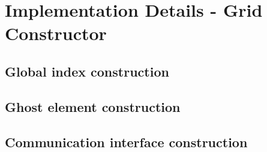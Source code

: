 \section{Implementation Details - Grid Constructor}
\subsection{Global index construction}
\subsection{Ghost element construction}
\subsection{Communication interface construction}